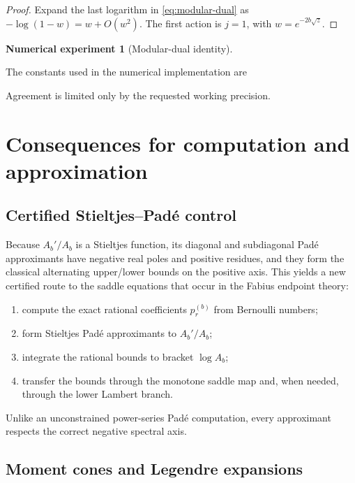 \documentclass[11pt]{article}
\theoremstyle{definition}
\newtheorem{experiment}[theorem]{Numerical experiment}
\theoremstyle{remark}
\begin{document}
\begin{proof}
Expand the last logarithm in \eqref{eq:modular-dual} as
\(-\log(1-w)=w+O(w^2)\).  The first action is \(j=1\), with
\(w=e^{-2b\sqrt z}\).
\end{proof}

\begin{experiment}[Modular-dual identity]
\begin{center}
\resizebox{\textwidth}{!}{}
\end{center}
The constants used in the numerical implementation are
\begin{center}

\end{center}
Agreement is limited only by the requested working precision.
\end{experiment}

\section{Consequences for computation and approximation}

\subsection{Certified Stieltjes--Pad\'e control}

Because \(A_b'/A_b\) is a Stieltjes function, its diagonal and subdiagonal Pad\'e approximants have negative real poles and positive residues, and they form the classical alternating upper/lower bounds on the positive axis.  This yields a new certified route to the saddle equations that occur in the Fabius endpoint theory:
\begin{enumerate}[leftmargin=2em]
  \item compute the exact rational coefficients \(p_r^{(b)}\) from Bernoulli numbers;
  \item form Stieltjes Pad\'e approximants to \(A_b'/A_b\);
  \item integrate the rational bounds to bracket \(\log A_b\);
  \item transfer the bounds through the monotone saddle map and, when needed, through the lower Lambert branch.
\end{enumerate}
Unlike an unconstrained power-series Pad\'e computation, every approximant respects the correct negative spectral axis.

\subsection{Moment cones and Legendre expansions}
\end{document}
